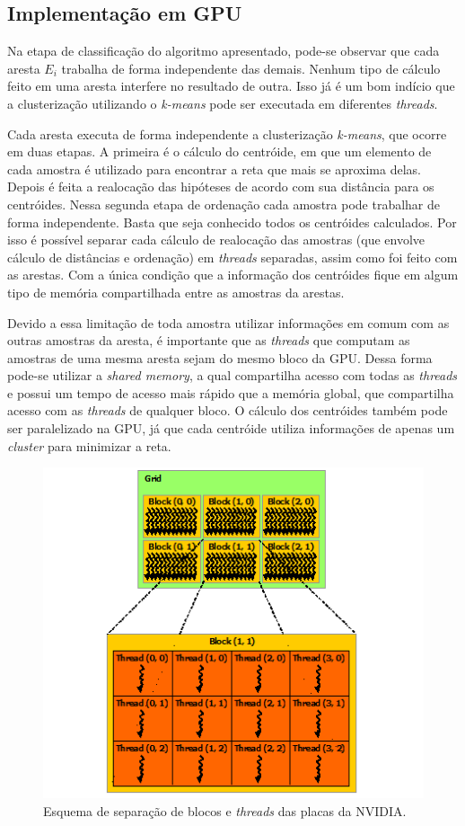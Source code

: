 \subsection{Implementação em GPU}

Na etapa de classificação do algoritmo apresentado, pode-se observar que cada aresta $E_i$ trabalha de forma independente das demais. Nenhum tipo de cálculo feito em uma aresta interfere no resultado de outra. Isso já é um bom indício que a clusterização utilizando o \emph{k-means} pode ser executada em diferentes \emph{threads}.

Cada aresta executa de forma independente a clusterização \emph{k-means}, que ocorre em duas etapas. A primeira é o cálculo do centróide, em que um elemento de cada amostra é utilizado para encontrar a reta que mais se aproxima delas. Depois é feita a realocação das hipóteses de acordo com sua distância para os centróides. Nessa segunda etapa de ordenação cada amostra pode trabalhar de forma independente. Basta que seja conhecido todos os centróides calculados. Por isso é possível separar cada cálculo de realocação das amostras (que envolve cálculo de distâncias e ordenação) em \emph{threads} separadas, assim como foi feito com as arestas. Com a única condição que a informação dos centróides fique em algum tipo de memória compartilhada entre as amostras da arestas.

Devido a essa limitação de toda amostra utilizar informações em comum com as outras amostras da aresta, é importante que as \emph{threads} que computam as amostras de uma mesma aresta sejam do mesmo bloco da GPU. Dessa forma pode-se utilizar a \emph{shared memory}, a qual compartilha acesso com todas as \emph{threads} e possui um tempo de acesso mais rápido que a memória global, que compartilha acesso com as \emph{threads} de qualquer bloco. O cálculo dos centróides também pode ser paralelizado na GPU, já que cada centróide utiliza informações de apenas um \emph{cluster} para minimizar a reta.

\begin{figure}[t]
\centering\includegraphics{monografia/cuda_grid}
\caption{Esquema de separação de blocos e \emph{threads} das placas da NVIDIA.}
\label{cuda_grid}
\end{figure}

